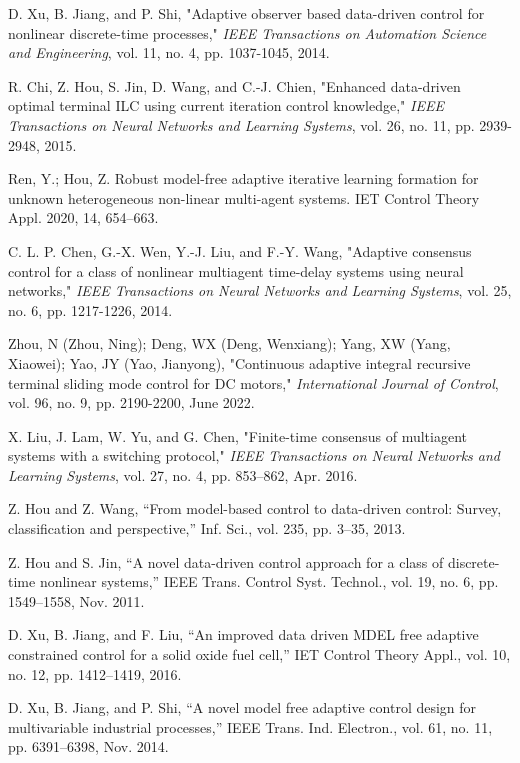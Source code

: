 \documentclass[journal,onecolumn]{IEEEtran}
\begin{document}
\begin{thebibliography}{99}
    D. Xu, B. Jiang, and P. Shi, "Adaptive observer based data-driven control for nonlinear discrete-time processes," \textit{IEEE Transactions on Automation Science and Engineering}, vol. 11, no. 4, pp. 1037-1045, 2014.
    
    R. Chi, Z. Hou, S. Jin, D. Wang, and C.-J. Chien, "Enhanced data-driven optimal terminal ILC using current iteration control knowledge," \textit{IEEE Transactions on Neural Networks and Learning Systems}, vol. 26, no. 11, pp. 2939-2948, 2015.
    
    Ren, Y.; Hou, Z. Robust model-free adaptive iterative learning formation for unknown heterogeneous non-linear multi-agent systems. IET Control Theory Appl. 2020, 14, 654–663.
    
    C. L. P. Chen, G.-X. Wen, Y.-J. Liu, and F.-Y. Wang, "Adaptive consensus control for a class of nonlinear multiagent time-delay systems using neural networks," \textit{IEEE Transactions on Neural Networks and Learning Systems}, vol. 25, no. 6, pp. 1217-1226, 2014.
    
    Zhou, N (Zhou, Ning); Deng, WX (Deng, Wenxiang); Yang, XW (Yang, Xiaowei); Yao, JY (Yao, Jianyong), "Continuous adaptive integral recursive terminal sliding mode control for DC motors," \textit{International Journal of Control}, vol. 96, no. 9, pp. 2190-2200, June 2022.
    
    X. Liu, J. Lam, W. Yu, and G. Chen, "Finite-time consensus of multiagent systems with a switching protocol," \emph{IEEE Transactions on Neural Networks and Learning Systems}, vol. 27, no. 4, pp. 853–862, Apr. 2016.

    Z. Hou and Z. Wang, “From model-based control to data-driven control:
    Survey, classification and perspective,” Inf. Sci., vol. 235, pp. 3–35, 2013.

    Z. Hou and S. Jin, “A novel data-driven control approach for a class
    of discrete-time nonlinear systems,” IEEE Trans. Control Syst. Technol.,
    vol. 19, no. 6, pp. 1549–1558, Nov. 2011.

    D. Xu, B. Jiang, and F. Liu, “An improved data driven MDEL free adaptive
    constrained control for a solid oxide fuel cell,” IET Control Theory Appl.,
    vol. 10, no. 12, pp. 1412–1419, 2016.

    D. Xu, B. Jiang, and P. Shi, “A novel model free adaptive control design
    for multivariable industrial processes,” IEEE Trans. Ind. Electron., vol. 61,
    no. 11, pp. 6391–6398, Nov. 2014.


\end{thebibliography}
\end{document}
